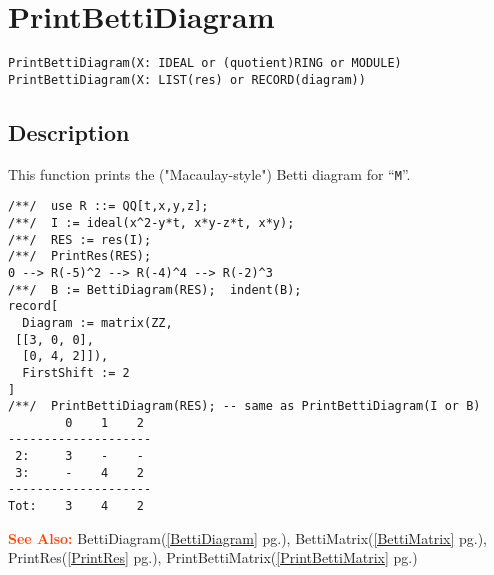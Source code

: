 \documentclass[a4paper]{mybook}
\newenvironment{command}{}{} %
\newcommand\SeeAlso{\par\textcolor{OrangeRed}{\textbf{\large See Also: }}}
\begin{document}
\section{PrintBettiDiagram}
\label{PrintBettiDiagram}
\begin{command} %


\begin{Verbatim}[label=syntax, rulecolor=\color{MidnightBlue},
frame=single]
PrintBettiDiagram(X: IDEAL or (quotient)RING or MODULE)
PrintBettiDiagram(X: LIST(res) or RECORD(diagram))
\end{Verbatim}


\subsection*{Description}

This function prints the ("Macaulay-style") Betti diagram for ``\verb&M&''.
\begin{Verbatim}[label=example, rulecolor=\color{PineGreen}, frame=single]
/**/  use R ::= QQ[t,x,y,z];
/**/  I := ideal(x^2-y*t, x*y-z*t, x*y);
/**/  RES := res(I);
/**/  PrintRes(RES);
0 --> R(-5)^2 --> R(-4)^4 --> R(-2)^3
/**/  B := BettiDiagram(RES);  indent(B);
record[
  Diagram := matrix(ZZ,
 [[3, 0, 0],
  [0, 4, 2]]),
  FirstShift := 2
]
/**/  PrintBettiDiagram(RES); -- same as PrintBettiDiagram(I or B)
        0    1    2
--------------------
 2:     3    -    -
 3:     -    4    2
--------------------
Tot:    3    4    2
\end{Verbatim}


\SeeAlso %
  BettiDiagram(\ref{BettiDiagram} pg.\pageref{BettiDiagram}), 
    BettiMatrix(\ref{BettiMatrix} pg.\pageref{BettiMatrix}), 
    PrintRes(\ref{PrintRes} pg.\pageref{PrintRes}), 
    PrintBettiMatrix(\ref{PrintBettiMatrix} pg.\pageref{PrintBettiMatrix})
\end{command} %
\end{document}
